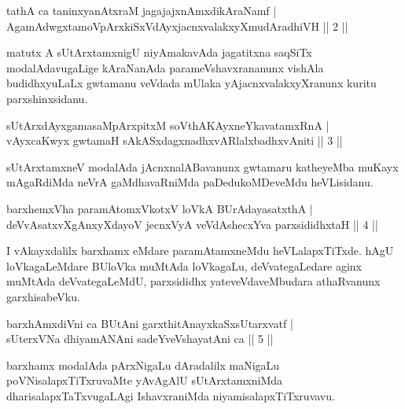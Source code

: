 \begin{shl}
tathA ca taninxyanAtxraM jagajajxnAmxdikAraNamf |\\
AgamAdwgxtamoV\s pArxkiSxVdAyxjacnxvalakxyXmudAradhiVH \hfill || 2 ||
\end{shl}

\begin{artha}
matutx A sUtArxtamxnigU niyAmakavAda jagatitxna saqSiTx modalAdavugaLige kAraNanAda parameVshavxrananunx vishAla budidhxyuLaLx gwtamanu veVdada mUlaka yAjacnxvalakxyXranunx kuritu parxshinxsidanu.
\end{artha}

\begin{shl}
sUtArxdAyxgamasaMpArxpitxM soV\s thA\s \s KAyxneYkavatamxRnA |\\
vAyxcaKwyx gwtamaH sAkASxdagxnadhxvARlalxbadhxvAniti \hfill || 3 ||
\end{shl}

\begin{artha}
sUtArxtamxneV modalAda jAcnxnalABavanunx gwtamaru katheyeMba muKayx mAgaRdiMda neVrA gaMdhavaRniMda paDedukoMDeveMdu heVLisidanu.
\end{artha}

\begin{shl}
barxhemxVha paramAtomxVkotxV loVkA BUrAdayasatxthA |\\
deVvAsatxvXgAnxyXdayoV jecnxVyA veVdAshecxYva parxsididhxtaH \hfill || 4 ||
\end{shl}

\begin{artha}
I vAkayxdalilx barxhamx eMdare paramAtamxneMdu heVLalapxTiTxde. hAgU loVkagaLeMdare BUloVka muMtAda loVkagaLu, deVvategaLedare aginx muMtAda deVvategaLeMdU, parxsididhx yateveVdaveMbudara athaRvanunx garxhisabeVku.
\end{artha}%


\begin{shl}
barxhAmxdiVni ca BUtAni garxthitAnayxkaSxsUtarxvatf |\\
sUterxVNa dhiyamANAni sadeYveVshayatAni ca \hfill || 5 ||
\end{shl}

\begin{artha}
barxhamx modalAda pArxNigaLu dAradalilx maNigaLu poVNisalapxTiTxruvaMte yAvAgAlU sUtArxtamxniMda dharisalapxTaTxvugaLAgi IshavxraniMda niyamisalapxTiTxruvavu.
\end{artha}

